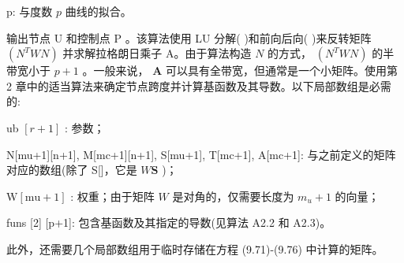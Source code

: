 \documentclass[../main.tex]{subfiles}
\begin{document}
p: 与度数 \(p\) 曲线的拟合。

输出节点 \(\mathrm{U}\) 和控制点 \(\mathrm{P}\) 。该算法使用 LU 分解(   )和前向后向(   )来反转矩阵 \(\left( {{N}^{T}{WN}}\right)\) 并求解拉格朗日乘子 A。由于算法构造 \(N\) 的方式， \(\left( {{N}^{T}{WN}}\right)\) 的半带宽小于 \(p + 1\) 。一般来说， \(\mathbf{A}\) 可以具有全带宽，但通常是一个小矩阵。使用第 2 章中的适当算法来确定节点跨度并计算基函数及其导数。以下局部数组是必需的:

ub \(\left\lbrack  {r + 1}\right\rbrack\) : 参数；

N[mu+1][n+1], M[mc+1][n+1], S[mu+1], T[mc+1], A[mc+1]: 与之前定义的矩阵对应的数组(除了 S[]，它是 \(W\mathbf{S}\) )；

\(\mathrm{W}\left\lbrack  {\mathrm{{mu}} + 1}\right\rbrack\) : 权重；由于矩阵 \(W\) 是对角的，仅需要长度为 \({m}_{u} + 1\) 的向量；

funs [2] [p+1]: 包含基函数及其指定的导数(见算法 A2.2 和 A2.3)。

此外，还需要几个局部数组用于临时存储在方程 (9.71)-(9.76) 中计算的矩阵。
\end{document}
